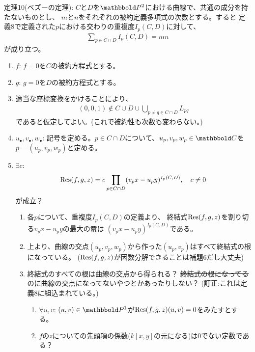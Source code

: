 \begin{framed}
  定理10(ベズーの定理):
  $C$と$D$を$\P^2$における曲線で、共通の成分を持たないものとし、
  $m$と$n$をそれぞれの被約定義多項式の次数とする。すると
  定義8で定義された$p$における交わりの重複度$I_p(C,D)$に対して、
  \begin{align}
    \sum_{p\in C\cap D}I_p(C,D) = mn
  \end{align}
  が成り立つ。
\end{framed}
\begin{myproof}
  \begin{enumerate}
    \item  $f$:
    $f=0$を$C$の被約方程式とする。
    \item $g$: $g=0$を$D$の被約方程式とする。
    \item 適当な座標変換をかけることにより、
    \begin{align}
      (0,0,1)\notin
      C\cup D \cup \bigcup_{p\neq q \in C\cap D} L_{pq}
    \end{align}
    であると仮定してよい。(これで被約性も次数も変わらない。)
    \item $u_\bullet,v_\bullet,w_\bullet$: 記号を定める。$p\in C\cap D$について、$u_p,v_p,w_p \in \C$を
    $p=(u_p,v_p,w_p)$と定める。
    \item $\exists c$:
    \begin{align}
      \mathrm{Res}(f,g,z) =
      c \prod_{p\in C\cap D} (v_p x - u_p y)^{I_p(C,D)},\quad c\neq 0
    \end{align}
    が成立？
    \begin{enumerate}
      \item
      各$p$について、重複度$I_p(C,D)$の定義より、
      終結式$\mathrm{Res}(f,g,z)$を割り切る$v_p x - u_p y$の最大の羃は
      $(v_p x - u_p y)^{I_p(C,D)}$である。
      \item
      上より、曲線の交点$(u_p,v_p,w_p)$から作った$(u_p,v_p)$はすべて終結式の根になっている。
      ($\mathrm{Res}(f,g,z)$が因数分解できることは補題6だし大丈夫)
      \item
      終結式のすべての根は曲線の交点から得られる？
      \sout{終結式の根になってるのに曲線の交点になってないやつとかあったりしない？}
      (訂正:これは定義8に組込まれている。)
      \begin{enumerate}
        \item $\forall u,v$: $(u,v) \in \P^1$が$\mathrm{Res}(f,g,z)(u,v) = 0$をみたすとする。
        \item
        $f$の$z$についての先頭項の係数($k[x,y]$の元になる)は0でない定数である？
        \begin{enumerate}

\end{enumerate}
\end{enumerate}
\end{enumerate}
\end{enumerate}
\end{myproof}
